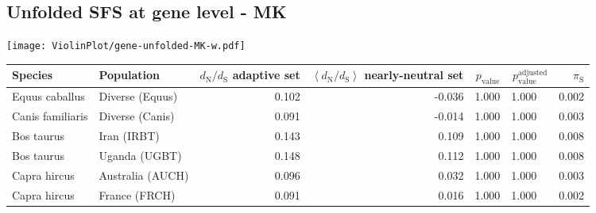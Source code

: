 \subsection{Unfolded SFS at gene level - MK} 
\begin{center}
\texttt{[image: ViolinPlot/gene-unfolded-MK-w.pdf]} 
\begin{adjustbox}{width = 1\textwidth}
\begin{tabular}{|l|l|r|r|r|r|r|}
\toprule
             Species &                      Population & \specialcell{$d_{\mathrm{N}} / d_{\mathrm{S}}$ \\ adaptive set} & \specialcell{$\left< d_{\mathrm{N}} / d_{\mathrm{S}} \right>$ \\ nearly-neutral set} & $p_{\mathrm{value}}$ & $p_{\mathrm{value}}^{\mathrm{adjusted}}$ & $\pi_{\textrm{S}}$ \\
\midrule
      Equus caballus &                 Diverse (Equus) &                                              0.102 &                                             -0.036 &                1.000 &                                  1.000~~ &              0.002 \\
    Canis familiaris &                 Diverse (Canis) &                                              0.091 &                                             -0.014 &                1.000 &                                  1.000~~ &              0.003 \\
          Bos taurus &                     Iran (IRBT) &                                              0.143 &                                              0.109 &                1.000 &                                  1.000~~ &              0.008 \\
          Bos taurus &                   Uganda (UGBT) &                                              0.148 &                                              0.112 &                1.000 &                                  1.000~~ &              0.008 \\
        Capra hircus &                Australia (AUCH) &                                              0.096 &                                              0.032 &                1.000 &                                  1.000~~ &              0.003 \\
        Capra hircus &                   France (FRCH) &                                              0.091 &                                              0.016 &                1.000 &                                  1.000~~ &              0.002 \\

\end{tabular}
\end{adjustbox}
\end{center}
